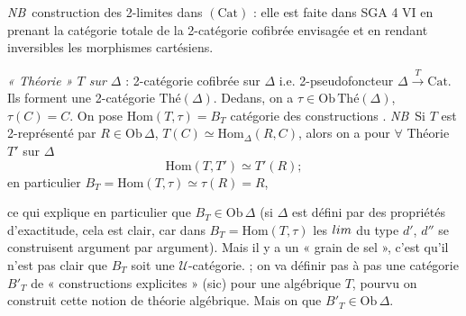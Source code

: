\documentclass[11pt,a4paper]{article}
\begin{document}
\emph{NB}\ construction des 2-limites dans $(\mathrm{Cat})$ : elle est
faite dans SGA 4 VI en prenant la catégorie totale de la 2-catégorie
cofibrée envisagée et en rendant inversibles les morphismes cartésiens.


\emph{« Théorie » $T$ sur $\Delta$} : 2-catégorie cofibrée sur $\Delta$
i.e. 2-pseudofoncteur $\Delta \xrightarrow{\ T\ } \mathrm{Cat}$. Ils forment
une 2-catégorie $\text{Thé}(\Delta)$. Dedans, on a $\tau \in
\mathrm{Ob}\,\text{Thé}(\Delta)$, $\tau(C) = C$. On pose
$\mathrm{Hom}(T, \tau) = B_{T}$ catégorie des constructions . \emph{NB}\ Si $T$ est 2-représenté par $R \in
\mathrm{Ob}\,\Delta$, $T(C) \simeq \mathrm{Hom}_{\Delta}(R, C)$, alors on a
 pour $\forall$ Théorie $T'$ sur $\Delta$
\[
  \mathrm{Hom}(T, T') \simeq T'(R) ;
\]
en particulier $B_{T} = \mathrm{Hom}(T, \tau) \simeq \tau(R) = R$,

ce qui explique en particulier que $B_{T} \in \mathrm{Ob}\,\Delta$ (si
$\Delta$ est défini par des propriétés d'exactitude, cela est clair, car
dans $B_{T} = \mathrm{Hom}(T, \tau)$ les $\varprojlim$ du type $d'$, $d''$
se construisent argument par argument). Mais il y a un « grain de sel »,
c'est qu'il n'est pas clair que $B_{T}$ soit une $\mathcal{U}$-catégorie.
 ; on va
définir pas à pas une catégorie $B'_{T}$ de « constructions explicites »
(sic) pour une   algébrique $T$, pourvu
\ill{} on construit cette notion de théorie algébrique. Mais on \ill{}
 que $B'_{T} \in \mathrm{Ob}\,\Delta$.


\end{document}
